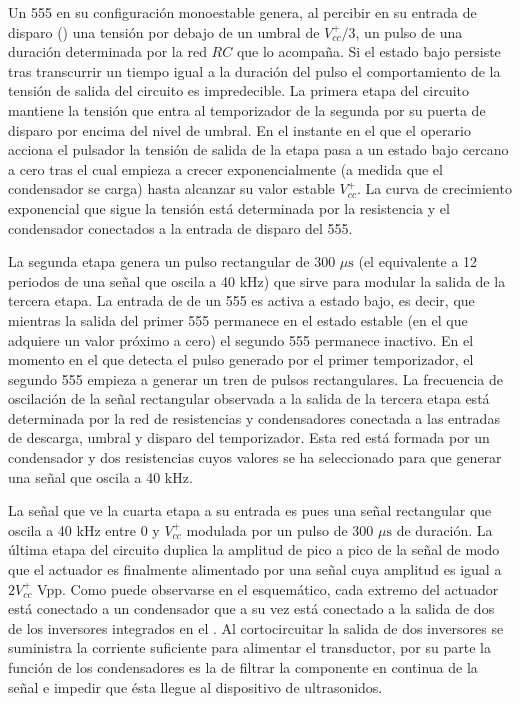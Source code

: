 Un 555 en su configuración monoestable genera, al percibir en su entrada de
disparo () una tensión por debajo de un umbral de $V^+_{cc}/3$,
un pulso de una duración determinada por la red $RC$ que lo acompaña. Si el
estado bajo persiste tras transcurrir un tiempo igual a la duración del
pulso el comportamiento de la tensión de salida del circuito es
impredecible. La primera etapa del circuito mantiene la tensión que entra
al temporizador de la segunda por su puerta de disparo por encima del nivel
de umbral. En el instante en el que el operario acciona el pulsador la
tensión de salida de la etapa pasa a un estado bajo cercano a cero tras el
cual empieza a crecer exponencialmente (a medida que el condensador se
carga) hasta alcanzar su valor estable $V^+_{cc}$. La curva de crecimiento
exponencial que sigue la tensión está determinada por la resistencia y el
condensador conectados a la entrada de disparo del 555.

La segunda etapa genera un pulso rectangular de 300 $\mu\text{s}$ (el
equivalente a 12 periodos de una señal que oscila a 40 kHz) que sirve para
modular la salida de la tercera etapa. La entrada de  de un 555
es activa a estado bajo, es decir, que mientras la salida del primer 555
permanece en el estado estable (en el que adquiere un valor próximo a cero)
el segundo 555 permanece inactivo. En el momento en el que detecta el pulso
generado por el primer temporizador, el segundo 555 empieza a generar un
tren de pulsos rectangulares. La frecuencia de oscilación de la señal
rectangular observada a la salida de la tercera etapa está determinada por
la red de resistencias y condensadores conectada a las entradas de
descarga, umbral y disparo del temporizador. Esta red está formada por un
condensador y dos resistencias cuyos valores se ha seleccionado para que
generar una señal que oscila a 40 kHz.

La señal que ve la cuarta etapa a su entrada es pues una señal rectangular
que oscila a 40 kHz entre 0 y $V^+_{cc}$ modulada por un pulso de 300
$\mu\text{s}$ de duración. La última etapa del circuito duplica la amplitud
de pico a pico de la señal de modo que el actuador es finalmente alimentado
por una señal cuya amplitud es igual a $2 V^+_{cc}$ Vpp. Como puede
observarse en el esquemático, cada extremo del actuador está conectado a un
condensador que a su vez está conectado a la salida de dos de los
inversores integrados en el . Al cortocircuitar la salida de
dos inversores se suministra la corriente suficiente para alimentar el
transductor, por su parte la función de los condensadores es la de filtrar
la componente en continua de la señal e impedir que ésta llegue al
dispositivo de ultrasonidos.
